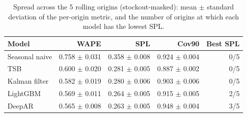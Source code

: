 \begin{table}[t]
\centering
\caption{Spread across the 5 rolling origins (stockout-masked): mean $\pm$ standard deviation of the per-origin metric, and the number of origins at which each model has the lowest SPL.}
\label{tab:origin}
\scriptsize
\setlength{\tabcolsep}{3pt}
\begin{tabular}{lrrrr}
\toprule
Model & WAPE & SPL & Cov90 & Best SPL \\
\midrule
Seasonal naive & 0.758 $\pm$ 0.031 & 0.358 $\pm$ 0.008 & 0.924 $\pm$ 0.004 & 0/5 \\
TSB & 0.600 $\pm$ 0.020 & 0.281 $\pm$ 0.005 & 0.887 $\pm$ 0.002 & 0/5 \\
Kalman filter & 0.582 $\pm$ 0.019 & 0.280 $\pm$ 0.006 & 0.903 $\pm$ 0.006 & 0/5 \\
LightGBM & 0.569 $\pm$ 0.011 & 0.264 $\pm$ 0.005 & 0.915 $\pm$ 0.005 & 2/5 \\
DeepAR & 0.565 $\pm$ 0.008 & 0.263 $\pm$ 0.005 & 0.948 $\pm$ 0.004 & 3/5 \\
\bottomrule
\end{tabular}
\end{table}